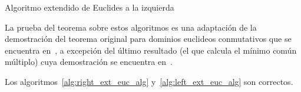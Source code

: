 \begin{algorithm}[H]\label{alg:left_ext_euc_alg}
 \caption{Algoritmo extendido de Euclides a la izquierda}
\end{algorithm}

La prueba del teorema sobre estos algoritmos es una adaptación de la demostración del teorema original para dominios euclideos conmutativos que se encuentra en~\cite{algI}, a excepción del último resultado (el que calcula el mínimo común múltiplo) cuya demostración se encuentra en~\cite{bueso2003algorithmic}.
\begin{theorem}
    Los algoritmos~\ref{alg:right_ext_euc_alg} y~\ref{alg:left_ext_euc_alg} son correctos.
\end{theorem}


